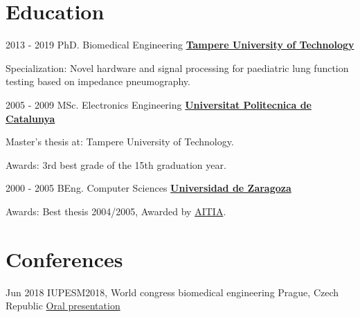 \documentclass[letterpaper]{twentysecondcv} %
\begin{document}
\begin{RigthPage2}
\section{Education}


\begin{twenty} %
	\twentyitemlist
    	{2013 - 2019}
        {PhD. Biomedical Engineering}
        {\href{https://www.tut.fi/}{\textbf{Tampere University of Technology}}}
        {
        \item Specialization: Novel hardware and signal processing for paediatric lung function testing based on impedance pneumography.}
	\twentyitemlist
    	{2005 - 2009}
        {MSc. Electronics Engineering}
        {\href{https://www.upc.cat}{\textbf{Universitat Politecnica de Catalunya}}}
        {
        \item Master's thesis at: Tampere University of Technology.
        \item Awards: 3rd best grade of the 15th graduation year.
        }
     \twentyitemlist
    	{2000 - 2005}
        {BEng. Computer Sciences }
        {\href{http://www.unizar.es/}{\textbf{Universidad de Zaragoza } }}
        {
        \item Awards: Best thesis 2004/2005, Awarded by \href{http://www.aitia.org/}{AITIA}.}
\end{twenty}


\section{Conferences }

\begin{twenty} %

	\twentyitem
    	{Jun 2018}
        {IUPESM2018, World congress biomedical engineering}
        {Prague, Czech Republic}
        {\href{https://www.slideshare.net/slideshow/embed_code/key/z0l5pXuzNVj5EG}{Oral presentation}}
        


\end{twenty}
\end{RigthPage2}
\end{document}
